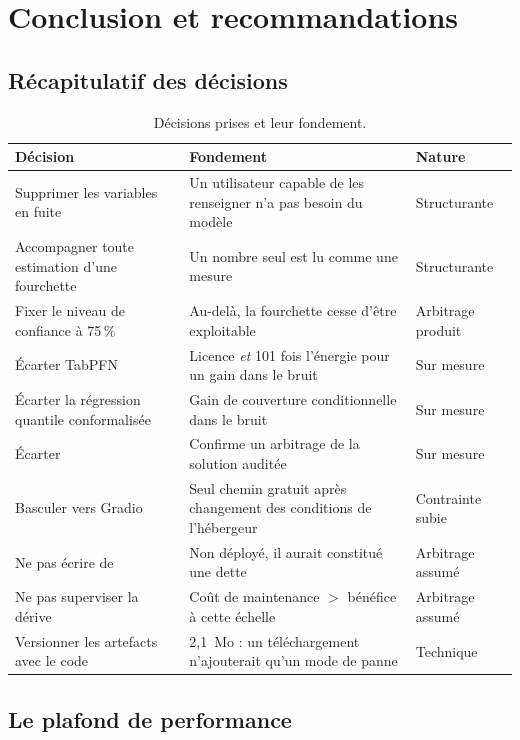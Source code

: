 \section{Conclusion et recommandations}

\subsection{Récapitulatif des décisions}

\begin{table}[H]
\centering
\small
\begin{tabularx}{\linewidth}{@{}L{4.2cm}XL{2.6cm}@{}}
\toprule
\textbf{Décision} & \textbf{Fondement} & \textbf{Nature} \\
\midrule
Supprimer les variables en fuite & Un utilisateur capable de les renseigner n'a pas besoin du modèle & Structurante \\
Accompagner toute estimation d'une fourchette & Un nombre seul est lu comme une mesure & Structurante \\
Fixer le niveau de confiance à 75\,\% & Au-delà, la fourchette cesse d'être exploitable & Arbitrage produit \\
Écarter TabPFN & Licence \emph{et} 101 fois l'énergie pour un gain dans le bruit & Sur mesure \\
Écarter la régression quantile conformalisée & Gain de couverture conditionnelle dans le bruit & Sur mesure \\
Écarter  & Confirme un arbitrage de la solution auditée & Sur mesure \\
Basculer vers Gradio & Seul chemin gratuit après changement des conditions de l'hébergeur & Contrainte subie \\
Ne pas écrire de  & Non déployé, il aurait constitué une dette & Arbitrage assumé \\
Ne pas superviser la dérive & Coût de maintenance $>$ bénéfice à cette échelle & Arbitrage assumé \\
Versionner les artefacts avec le code & 2,1~Mo : un téléchargement n'ajouterait qu'un mode de panne & Technique \\
\bottomrule
\end{tabularx}
\caption{Décisions prises et leur fondement.}
\end{table}

\subsection{Le plafond de performance}

